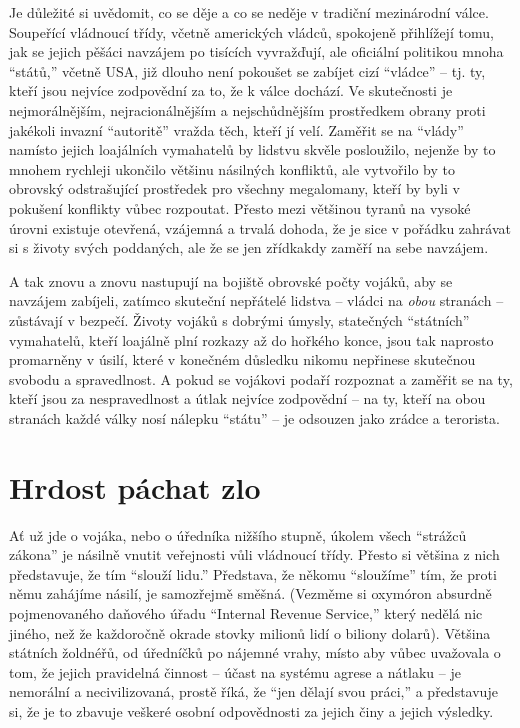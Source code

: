 \documentclass{book}
\begin{document}
Je důležité si uvědomit, co se děje a co se neděje v tradiční mezinárodní válce. Soupeřící vládnoucí třídy, včetně amerických vládců, spokojeně přihlížejí tomu, jak se jejich pěšáci navzájem po tisících vyvražďují, ale oficiální politikou mnoha \enquote{států,} včetně USA, již dlouho není pokoušet se zabíjet cizí \enquote{vládce} -- tj. ty, kteří jsou nejvíce zodpovědní za to, že k válce dochází. Ve skutečnosti je nejmorálnějším, nejracionálnějším a nejschůdnějším prostředkem obrany proti jakékoli invazní \enquote{autoritě} vražda těch, kteří jí velí. Zaměřit se na \enquote{vlády} namísto jejich loajálních vymahatelů by lidstvu skvěle posloužilo, nejenže by to mnohem rychleji ukončilo většinu násilných konfliktů, ale vytvořilo by to obrovský odstrašující prostředek pro všechny megalomany, kteří by byli v pokušení konflikty vůbec rozpoutat. Přesto mezi většinou tyranů na vysoké úrovni existuje otevřená, vzájemná a trvalá dohoda, že je sice v pořádku zahrávat si s životy svých poddaných, ale že se jen zřídkakdy zaměří na sebe navzájem.

A tak znovu a znovu nastupují na bojiště obrovské počty vojáků, aby se navzájem zabíjeli, zatímco skuteční nepřátelé lidstva -- vládci na \emph{obou} stranách -- zůstávají v bezpečí. Životy vojáků s dobrými úmysly, statečných \enquote{státních} vymahatelů, kteří loajálně plní rozkazy až do hořkého konce, jsou tak naprosto promarněny v úsilí, které v konečném důsledku nikomu nepřinese skutečnou svobodu a spravedlnost. A pokud se vojákovi podaří rozpoznat a zaměřit se na ty, kteří jsou za nespravedlnost a útlak nejvíce zodpovědní -- na ty, kteří na obou stranách každé války nosí nálepku \enquote{státu} -- je odsouzen jako zrádce a terorista.

\section{Hrdost páchat zlo}

Ať už jde o vojáka, nebo o úředníka nižšího stupně, úkolem všech \enquote{strážců zákona} je násilně vnutit veřejnosti vůli vládnoucí třídy. Přesto si většina z nich představuje, že tím \enquote{slouží lidu.} Představa, že někomu \enquote{sloužíme} tím, že proti němu zahájíme násilí, je samozřejmě směšná. (Vezměme si oxymóron absurdně pojmenovaného daňového úřadu \enquote{Internal Revenue Service,} který nedělá nic jiného, než že každoročně okrade stovky milionů lidí o biliony dolarů). Většina státních žoldnéřů, od úředníčků po nájemné vrahy, místo aby vůbec uvažovala o tom, že jejich pravidelná činnost -- účast na systému agrese a nátlaku -- je nemorální a necivilizovaná, prostě říká, že \enquote{jen dělají svou práci,} a představuje si, že je to zbavuje veškeré osobní odpovědnosti za jejich činy a jejich výsledky.
\end{document}
